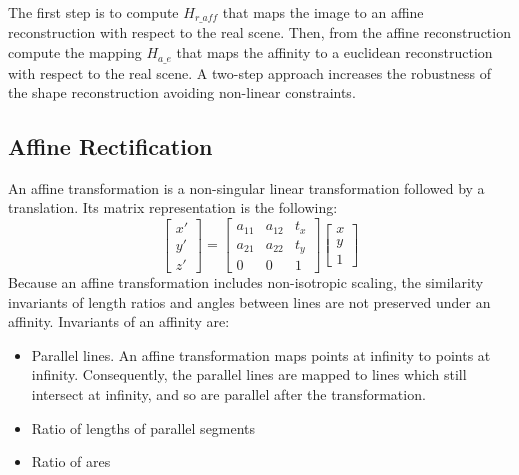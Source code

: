 \documentclass[11pt, oneside]{article}   	%
\begin{document}

The first step is to compute $H_{r\_aff}$ that maps the image to an affine reconstruction with respect to the real scene. Then, from the affine reconstruction compute the mapping $H_{a\_e}$ that maps the affinity to a euclidean reconstruction with respect to the real scene. A two-step approach increases the robustness of the shape reconstruction avoiding non-linear constraints. 

\subsection{Affine Rectification}
An affine transformation is a non-singular linear transformation followed by a translation.
Its matrix representation is the following:
\begin{equation}
\begin{bmatrix}
x' \\ y' \\ z' 
\end{bmatrix}
= 
\begin{bmatrix}
a_{11} & a_{12} & t_x \\ a_{21} & a_{22} & t_y  \\ 0 & 0 & 1
\end{bmatrix}
\begin{bmatrix}
x \\ y \\ 1
\end{bmatrix}
\end{equation}
Because an affine transformation includes non-isotropic scaling, the similarity invariants of length ratios and angles between lines are not preserved under an affinity.
Invariants of an affinity are:
\begin{itemize}
\item Parallel lines. An affine transformation maps points at infinity to points  at infinity. Consequently, the parallel lines are mapped to lines which still intersect at infinity, and so are parallel after the transformation.
\item Ratio of lengths of parallel segments
\item Ratio of ares
\end{itemize}
\end{document}
